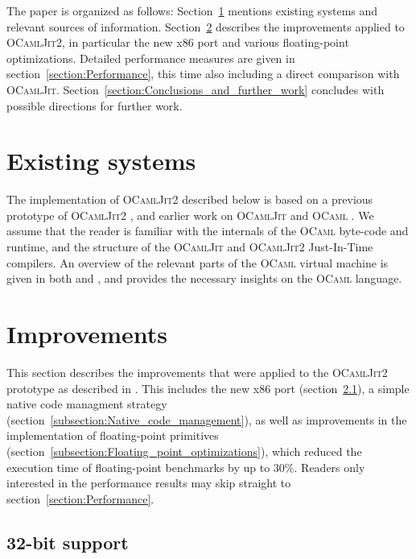 \documentclass[12pt,a4paper,final]{article}
\begin{document}
The paper is organized as follows: Section~\ref{section:Existing_systems} mentions existing
systems and relevant sources of information. Section~\ref{section:Improvements} describes
the improvements applied to \textsc{OCamlJit2}, in particular the new x86 port and various
floating-point optimizations. Detailed performance measures are given in
section~\ref{section:Performance}, this time also including a direct comparison with
\textsc{OCamlJit}. Section~\ref{section:Conclusions_and_further_work} concludes with
possible directions for further work.


\section{Existing systems} \label{section:Existing_systems}

The implementation of \textsc{OCamlJit2} described below is based on a previous
prototype of \textsc{OCamlJit2} \cite{Meurer10:OCamlJit2.0}, and earlier work on
\textsc{OCamlJit} \cite{Starynkevitch04} and \textsc{OCaml} \cite{Leroy90,Leroy10,Leroy02,Remy02}.
We assume that the reader is familiar with the internals of the \textsc{OCaml} byte-code
and runtime, and the structure of the \textsc{OCamlJit} and \textsc{OCamlJit2} Just-In-Time
compilers. An overview of the relevant parts of the \textsc{OCaml} virtual machine is given
in both \cite{Meurer10:OCamlJit2.0} and \cite{Starynkevitch04}, and \cite{Remy02} provides
the necessary insights on the \textsc{OCaml} language.


\section{Improvements} \label{section:Improvements}

This section describes the improvements that were applied to the \textsc{OCamlJit2} prototype
as described in \cite{Meurer10:OCamlJit2.0}. This
includes the new x86 port (section~\ref{subsection:32_bit_support}), a simple native code managment
strategy (section~\ref{subsection:Native_code_management}), as well as improvements
in the implementation of floating-point primitives (section~\ref{subsection:Floating_point_optimizations}),
which reduced the execution time of floating-point benchmarks by up to $30\%$.
Readers only interested in the performance results may skip straight to section~\ref{section:Performance}.

\subsection{32-bit support} \label{subsection:32_bit_support}
\end{document}
